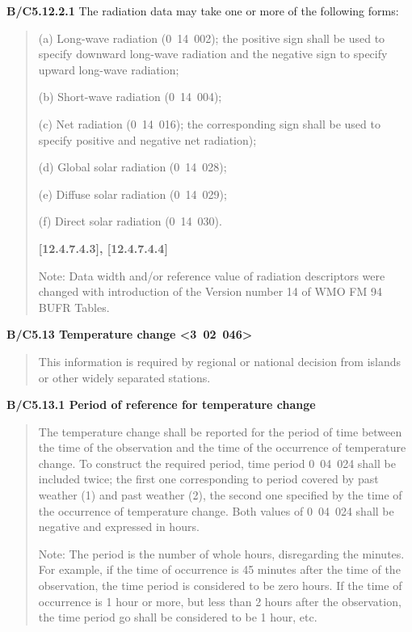 \textbf{B/C5.12.2.1} The radiation data may take one or more of the following forms:

\begin{quote}
(a) Long-wave radiation (0~14~002); the positive sign shall be used to specify downward long-wave radiation and the negative sign to specify upward long-wave radiation;

(b) Short-wave radiation (0~14~004);

(c) Net radiation (0~14~016); the corresponding sign shall be used to specify positive and negative net radiation);

(d) Global solar radiation (0~14~028);

(e) Diffuse solar radiation (0~14~029);

(f) Direct solar radiation (0~14~030).

\textbf{{[}12.4.7.4.3{]}, {[}12.4.7.4.4{]}}

Note: Data width and/or reference value of radiation descriptors were changed with introduction of the Version number 14 of WMO FM 94 BUFR Tables.
\end{quote}

\textbf{B/C5.13 Temperature change \textless3~02~046\textgreater{}}

\begin{quote}
This information is required by regional or national decision from islands or other widely separated stations.
\end{quote}

\textbf{B/C5.13.1 Period of reference for temperature change}

\begin{quote}
The temperature change shall be reported for the period of time between the time of the observation and the time of the occurrence of temperature change. To construct the required period, time period 0~04~024 shall be included twice; the first one corresponding to period covered by past weather (1) and past weather (2), the second one specified by the time of the occurrence of temperature change. Both values of 0~04~024 shall be negative and expressed in hours.

Note: The period is the number of whole hours, disregarding the minutes. For example, if the time of occurrence is 45 minutes after the time of the observation, the time period is considered to be zero hours. If the time of occurrence is 1 hour or more, but less than 2 hours after the observation, the time period go shall be considered to be 1 hour, etc.
\end{quote}

